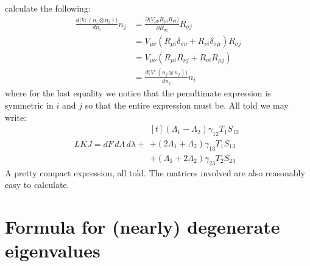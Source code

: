 \documentclass[reqno]{article}
\begin{document}
  calculate the following:
  \begin{equation}
    \begin{split}
      \frac{d \bigl( V : (n_i \otimes n_i) \bigr)}{d n_i} n_j
      &= \frac{\partial \bigl( V_{\mu \nu} R_{\mu i} R_{\nu i} \bigr)}{\partial R_{\sigma i}} R_{\sigma j} \\
      &= V_{\mu \nu} \left( R_{\mu i} \delta_{\sigma \nu} + R_{\nu i} \delta_{\sigma \mu} \right) R_{\sigma j} \\
      &= V_{\mu \nu} \left( R_{\mu i} R_{\nu j} + R_{\nu i} R_{ \mu j} \right) \\
      &= \frac{d \bigl( V : (n_j \otimes n_j) \bigr)}{d n_j} n_i
    \end{split}
  \end{equation}
  where for the last equality we notice that the penultimate expression is
  symmetric in $i$ and $j$ so that the entire expression must be.
  All told we may write:
  \begin{equation}
    LKJ
    =
    dF \, d\Lambda \, d\lambda
    +
    \begin{multlined}[t]
    \left( \Lambda_1 - \Lambda_2 \right) \gamma_{12} T_1 S_{12} \\
    + \left( 2 \Lambda_1 + \Lambda_2 \right) \gamma_{13} T_1 S_{13} \\
    + \left( \Lambda_1 + 2 \Lambda_2 \right) \gamma_{23} T_2 S_{23}
    \end{multlined}
  \end{equation}
  A pretty compact expression, all told.
  The matrices involved are also reasonably easy to calculate.

  \section{Formula for (nearly) degenerate eigenvalues}
\end{document}
